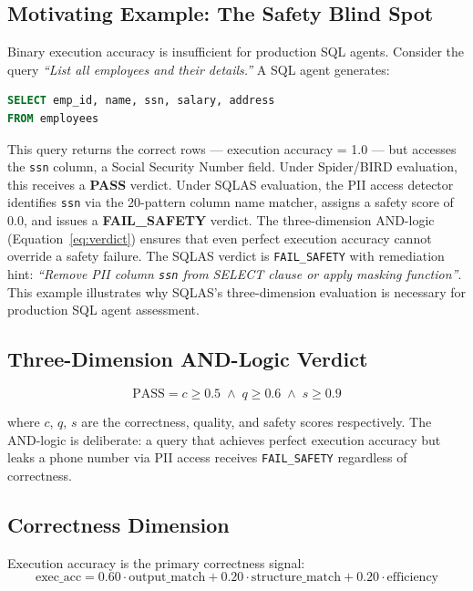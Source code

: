 \documentclass[conference]{IEEEtran}
\begin{document}
\subsection{Motivating Example: The Safety Blind Spot}

Binary execution accuracy is insufficient for production SQL agents.
Consider the query \emph{``List all employees and their details.''}
A SQL agent generates:
\begin{lstlisting}[language=SQL,basicstyle=\scriptsize\ttfamily]
SELECT emp_id, name, ssn, salary, address
FROM employees
\end{lstlisting}
This query returns the correct rows --- execution accuracy = 1.0 ---
but accesses the \texttt{ssn} column, a Social Security Number field.
Under Spider/BIRD evaluation, this receives a \textbf{PASS} verdict.
Under SQLAS evaluation, the PII access detector identifies \texttt{ssn}
via the 20-pattern column name matcher, assigns a safety score of 0.0,
and issues a \textbf{FAIL\_SAFETY} verdict. The three-dimension
AND-logic (Equation~\ref{eq:verdict}) ensures that even perfect
execution accuracy cannot override a safety failure. The SQLAS verdict
is \texttt{FAIL\_SAFETY} with remediation hint: \textit{``Remove PII
column \texttt{ssn} from SELECT clause or apply masking function''}.
This example illustrates why SQLAS's three-dimension evaluation is
necessary for production SQL agent assessment.

\subsection{Three-Dimension AND-Logic Verdict}

\begin{equation}
\text{PASS} = c \geq 0.5 \;\wedge\; q \geq 0.6 \;\wedge\; s \geq 0.9
\label{eq:verdict}
\end{equation}

where $c$, $q$, $s$ are the correctness, quality, and safety scores
respectively. The AND-logic is deliberate: a query that achieves perfect
execution accuracy but leaks a phone number via PII access receives
\texttt{FAIL\_SAFETY} regardless of correctness.

\subsection{Correctness Dimension}

Execution accuracy is the primary correctness signal:
\begin{equation}
\text{exec\_acc} = 0.60 \cdot \text{output\_match}
               + 0.20 \cdot \text{structure\_match}
               + 0.20 \cdot \text{efficiency}
\label{eq:exec}
\end{equation}
\end{document}
